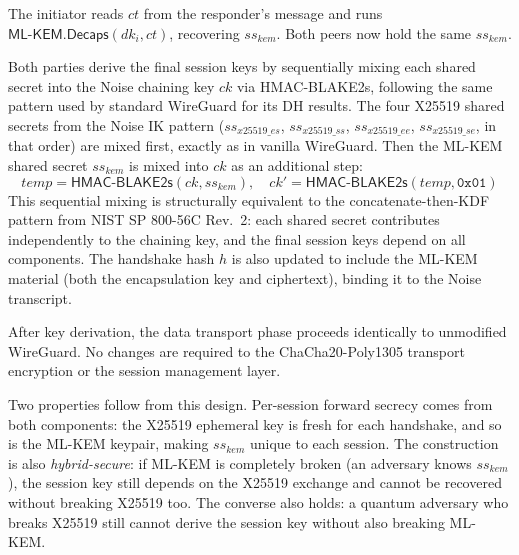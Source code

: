 \begin{description}[style=nextline, leftmargin=0pt]
    \item[Initiator Decapsulation]
    The initiator reads $\mathit{ct}$ from the responder's message and runs $\mathsf{ML\text{-}KEM.Decaps}(\mathit{dk}_i,\allowbreak \mathit{ct})$, recovering $\mathit{ss}_\mathit{kem}$. Both peers now hold the same $\mathit{ss}_\mathit{kem}$.
    
    \item[Combined Key Derivation]
    Both parties derive the final session keys by sequentially mixing each shared secret into the Noise chaining key $\mathit{ck}$ via HMAC-BLAKE2s, following the same pattern used by standard WireGuard for its DH results. The four X25519 shared secrets from the Noise IK pattern ($\mathit{ss}_\mathit{x25519\_es}$, $\mathit{ss}_\mathit{x25519\_ss}$, $\mathit{ss}_\mathit{x25519\_ee}$, $\mathit{ss}_\mathit{x25519\_se}$, in that order) are mixed first, exactly as in vanilla WireGuard. Then the ML-KEM shared secret $\mathit{ss}_\mathit{kem}$ is mixed into $\mathit{ck}$ as an additional step:
    \[
        \mathit{temp} = \mathsf{HMAC\text{-}BLAKE2s}(\mathit{ck}, \mathit{ss}_\mathit{kem}), \quad
        \mathit{ck}' = \mathsf{HMAC\text{-}BLAKE2s}(\mathit{temp}, \mathtt{0x01})
    \]
    This sequential mixing is structurally equivalent to the concatenate-then-KDF pattern from NIST SP 800-56C Rev.~2: each shared secret contributes independently to the chaining key, and the final session keys depend on all components. The handshake hash $h$ is also updated to include the ML-KEM material (both the encapsulation key and ciphertext), binding it to the Noise transcript.
    
    \item[Transport Phase]
    After key derivation, the data transport phase proceeds identically to unmodified WireGuard. No changes are required to the ChaCha20-Poly1305 transport encryption or the session management layer.
    \end{description}

    Two properties follow from this design.
 Per-session forward secrecy comes from both components: the X25519 ephemeral key is fresh for each handshake, and so is the ML-KEM keypair, making $\mathit{ss}_\mathit{kem}$ unique to each session. The construction is also \emph{hybrid-secure}: if ML-KEM is completely broken (an adversary knows $\mathit{ss}_\mathit{kem}$), the session key still depends on the X25519 exchange and cannot be recovered without breaking X25519 too. The converse also holds: a quantum adversary who breaks X25519 still cannot derive the session key without also breaking ML-KEM.

